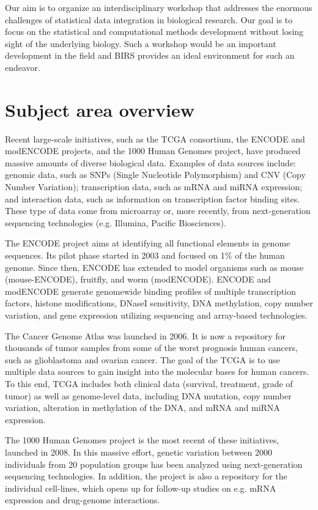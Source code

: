 \documentclass[12pt]{amsart}
\begin{document}
Our aim is to organize an interdisciplinary workshop that addresses
the enormous challenges of statistical data integration in biological
research. Our goal is to focus on the statistical and computational
methods development without losing sight of the underlying biology.
Such a workshop would be an important development in the field and
BIRS provides an ideal environment for such an endeavor.


\section*{Subject area overview}

Recent large-scale initiatives, such as the TCGA consortium, the ENCODE
and modENCODE projects, and the 1000 Human Genomes project, have
produced massive amounts of diverse biological data. Examples of data
sources include: genomic data, such as SNPs (Single Nucleotide
Polymorphism) and CNV (Copy Number Variation); transcription data,
such as mRNA and miRNA expression; and interaction data, such as
information on transcription factor binding sites.  These type of data come
from microarray or, more recently, from next-generation sequencing
technologies (e.g. Illumina, Pacific Biosciences).

The ENCODE project aims at identifying all functional elements in
genome sequences.  Its pilot phase started in 2003 and focused on 1\%
of the human genome. Since then, ENCODE has extended to model organisms
such as mouse (mouse-ENCODE), fruitfly, and worm (modENCODE).  ENCODE
and modENCODE generate genomewide binding profiles of multiple
transcription factors, histone modifications, DNaseI sensitivity, DNA
methylation, copy number variation, and gene expression utilizing
sequencing and array-based technologies.

The Cancer Genome Atlas was launched in 2006. It is now a repository
for thousands of tumor samples from some of the worst prognosis human
cancers, such as glioblastoma and ovarian cancer. The goal of the TCGA
is to use multiple data sources to gain insight into the molecular
bases for human cancers. To this end, TCGA includes both clinical data
(survival, treatment, grade of tumor) as well as genome-level data,
including DNA mutation, copy number variation, alteration in
methylation of the DNA, and mRNA and miRNA expression.

The 1000 Human Genomes project is the most recent of these
initiatives, launched in 2008. In this massive effort, genetic
variation between 2000 individuals from 20 population groups has been
analyzed using next-generation sequencing technologies. In addition,
the project is also a repository for the individual cell-lines, which
opens up for follow-up studies on e.g. mRNA expression and
drug-genome interactions.
\end{document}
